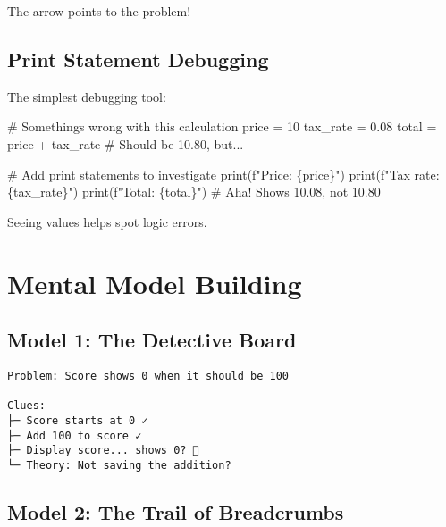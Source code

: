\documentclass[
  letterpaper,
  DIV=11,
  numbers=noendperiod,
  oneside]{scrreprt}
\newenvironment{Shaded}{}{}
\newcommand{\BuiltInTok}[1]{\textcolor[rgb]{0.84,0.23,0.29}{#1}}
\newcommand{\CommentTok}[1]{\textcolor[rgb]{0.42,0.45,0.49}{#1}}
\newcommand{\DecValTok}[1]{\textcolor[rgb]{0.00,0.36,0.77}{#1}}
\newcommand{\FloatTok}[1]{\textcolor[rgb]{0.00,0.36,0.77}{#1}}
\newcommand{\NormalTok}[1]{\textcolor[rgb]{0.14,0.16,0.18}{#1}}
\newcommand{\OperatorTok}[1]{\textcolor[rgb]{0.14,0.16,0.18}{#1}}
\newcommand{\SpecialCharTok}[1]{\textcolor[rgb]{0.00,0.36,0.77}{#1}}
\newcommand{\SpecialStringTok}[1]{\textcolor[rgb]{0.01,0.18,0.38}{#1}}
\begin{document}
The arrow points to the problem!

\subsection{Print Statement Debugging}\label{print-statement-debugging}

The simplest debugging tool:

\begin{Shaded}
\begin{Highlighting}[]
\CommentTok{\# Something\textquotesingle{}s wrong with this calculation}
\NormalTok{price }\OperatorTok{=} \DecValTok{10}
\NormalTok{tax\_rate }\OperatorTok{=} \FloatTok{0.08}
\NormalTok{total }\OperatorTok{=}\NormalTok{ price }\OperatorTok{+}\NormalTok{ tax\_rate  }\CommentTok{\# Should be 10.80, but...}

\CommentTok{\# Add print statements to investigate}
\BuiltInTok{print}\NormalTok{(}\SpecialStringTok{f"Price: }\SpecialCharTok{\{}\NormalTok{price}\SpecialCharTok{\}}\SpecialStringTok{"}\NormalTok{)}
\BuiltInTok{print}\NormalTok{(}\SpecialStringTok{f"Tax rate: }\SpecialCharTok{\{}\NormalTok{tax\_rate}\SpecialCharTok{\}}\SpecialStringTok{"}\NormalTok{)}
\BuiltInTok{print}\NormalTok{(}\SpecialStringTok{f"Total: }\SpecialCharTok{\{}\NormalTok{total}\SpecialCharTok{\}}\SpecialStringTok{"}\NormalTok{)  }\CommentTok{\# Aha! Shows 10.08, not 10.80}
\end{Highlighting}
\end{Shaded}

Seeing values helps spot logic errors.

\section{Mental Model Building}\label{mental-model-building-8}

\subsection{Model 1: The Detective
Board}\label{model-1-the-detective-board}

\begin{verbatim}
Problem: Score shows 0 when it should be 100

Clues:
├─ Score starts at 0 ✓
├─ Add 100 to score ✓
├─ Display score... shows 0? 🤔
└─ Theory: Not saving the addition?
\end{verbatim}

\subsection{Model 2: The Trail of
Breadcrumbs}\label{model-2-the-trail-of-breadcrumbs}
\end{document}
